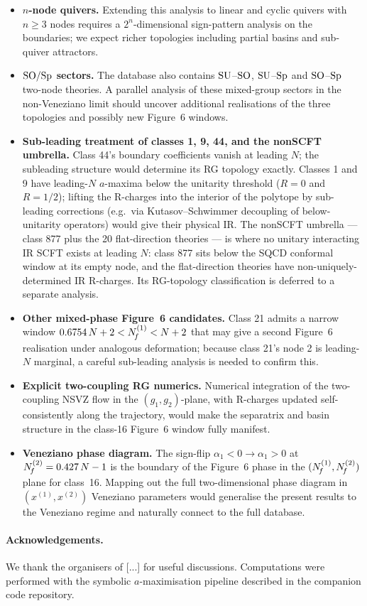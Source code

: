 \begin{itemize}
  \item \textbf{$n$-node quivers.}  Extending this analysis to linear
    and cyclic quivers with $n\ge 3$ nodes requires a
    $2^{n}$-dimensional sign-pattern analysis on the boundaries; we
    expect richer topologies including partial basins and sub-quiver
    attractors.
  \item \textbf{$\mathrm{SO}/\mathrm{Sp}$ sectors.}  The database also contains
    $\mathrm{SU}$--$\mathrm{SO}$, $\mathrm{SU}$--$\mathrm{Sp}$ and $\mathrm{SO}$--$\mathrm{Sp}$ two-node theories.  A
    parallel analysis of these mixed-group sectors in the
    non-Veneziano limit should uncover additional realisations of the
    three topologies and possibly new Figure~6 windows.
  \item \textbf{Sub-leading treatment of classes 1, 9, 44, and the
    nonSCFT umbrella.}
    Class 44's boundary coefficients vanish at leading $N$; the
    subleading structure would determine its RG topology exactly.
    Classes 1 and 9 have leading-$N$ $a$-maxima below the unitarity
    threshold ($R=0$ and $R=1/2$); lifting the R-charges into the
    interior of the polytope by sub-leading corrections (e.g.\ via
    Kutasov--Schwimmer decoupling of below-unitarity operators) would
    give their physical IR.  The nonSCFT umbrella — class 877 plus
    the 20 flat-direction theories — is where no unitary interacting
    IR SCFT exists at leading $N$: class 877 sits below the SQCD
    conformal window at its empty node, and the flat-direction
    theories have non-uniquely-determined IR R-charges.  Its
    RG-topology classification is deferred to a separate analysis.
  \item \textbf{Other mixed-phase Figure~6 candidates.}  Class 21
    admits a narrow window $0.6754\,N+2<N_{\!f}^{(1)}<N+2$ that may
    give a second Figure~6 realisation under analogous deformation;
    because class 21's node 2 is leading-$N$ marginal, a careful
    sub-leading analysis is needed to confirm this.
  \item \textbf{Explicit two-coupling RG numerics.}  Numerical
    integration of the two-coupling NSVZ flow in the
    $(g_{1},g_{2})$-plane, with R-charges updated self-consistently
    along the trajectory, would make the separatrix and basin
    structure in the class-16 Figure~6 window fully manifest.
  \item \textbf{Veneziano phase diagram.}  The sign-flip
    $\alpha_{1}<0\to\alpha_{1}>0$ at $N_{\!f}^{(2)}=0.427\,N-1$ is the
    boundary of the Figure~6 phase in the $(N_{\!f}^{(1)},N_{\!f}^{(2)})$
    plane for class~16.  Mapping out the full two-dimensional phase
    diagram in $(x^{(1)},x^{(2)})$ Veneziano parameters would
    generalise the present results to the Veneziano regime and
    naturally connect to the full database.
\end{itemize}

\paragraph{Acknowledgements.}  We thank the organisers of [...] for
useful discussions.  Computations were performed with the symbolic
$a$-maximisation pipeline described in the companion code repository.
